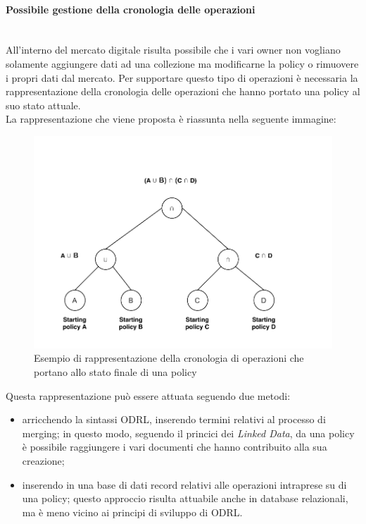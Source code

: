 \documentclass[12pt,a4paper,twoside]{book}
\begin{document}
\paragraph{Possibile gestione della cronologia delle operazioni}\mbox{}\\
All'interno del mercato digitale risulta possibile che i vari owner non vogliano solamente aggiungere dati ad una collezione ma modificarne la policy o rimuovere i propri dati dal mercato. Per supportare questo tipo di operazioni è necessaria la rappresentazione della cronologia delle operazioni che hanno portato una policy al suo stato attuale.\\
La rappresentazione che viene proposta è riassunta nella seguente immagine:
\begin{figure}[H]
\centering
\includegraphics[scale=.80]{../immagini/historyFirst.pdf}
\caption{Esempio di rappresentazione della cronologia di operazioni che portano allo stato finale di una policy}
\label{historyFirst}
\end{figure}
Questa rappresentazione può essere attuata seguendo due metodi:
\begin{itemize}
\item arricchendo la sintassi ODRL, inserendo termini relativi al processo di merging; in questo modo, seguendo il princici dei \textit{Linked Data}, da una policy è possibile raggiungere i vari documenti che hanno contribuito alla sua creazione;
\item inserendo in una base di dati record relativi alle operazioni intraprese su di una policy; questo approccio risulta attuabile anche in database relazionali, ma è meno vicino ai principi di sviluppo di ODRL.
\end{itemize}
\end{document}
